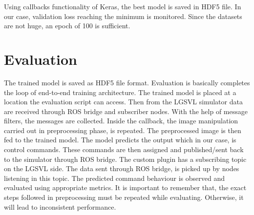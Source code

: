 Using callbacks functionality of Keras, the best model is saved in HDF5 file. In our case, validation
loss  reaching the minimum is monitored. Since the datasets are not huge, an epoch of 100
is sufficient.

\section{Evaluation}
The trained model is saved as HDF5 file format. Evaluation is basically completes the loop
of end-to-end training architecture. The trained model is placed at a location the
evaluation script can access. Then from the LGSVL simulator data are received through ROS
bridge and subscriber nodes. With the help of message filters, the messages are collected.
Inside the callback, the image manipulation carried out in preprocessing phase, is
repeated. The preprocessed image is then fed to the trained model. The model predicts the
output which in our case, is control commands. These commands are then assigned and published/sent
back to the simulator through ROS bridge. The custom plugin has a subscribing topic on the
LGSVL side. The data sent through ROS bridge, is picked up by nodes listening in this topic. The predicted command behaviour is observed and
evaluated using appropriate metrics. It is important to remember that, the exact steps followed
in preprocessing must be repeated while evaluating. Otherwise, it will lead to inconsistent
performance.
\iffalse
\section{What to include here?}

\begin{enumerate}
    \item Docker - Dockerfile contents - docker scripts - how they are invoked.
    \item LGSVL - C\# language, Unity engine, code organisation, sensor plugin and its
        structure, data type conversion, WebUI - JSON- sensors used. Making Radar work,
        Increasing traffic density and time at the signal.
    \item Data collection - ROS2- ros2 message types - topics - msgfilters -
        approx-sync - callback- cv2 libraries - saving. Also ROS2 web bridge.
    \item Preprocessing - CV2 image manipulation - stacking, concatenate  -
        Time series LSTM stuff - saving in HDF5.
    \item Training - Loading hdf5 - splitting data - Functional API - normalisation
        - datafusion - early, late - concat - batch normalisation - stride - kernel -
        flatten - FC - prediction - Activation function - loss function - learning rate -
        optimizer - epochs - shuffling - batch size - callbacks - ES - MC - TB - saving
        models.
    \item Evaluation - similar stuff to data collect - image manipulation - prediction -
        publishing. How to validate evaluation?

\end{enumerate}

\fi
